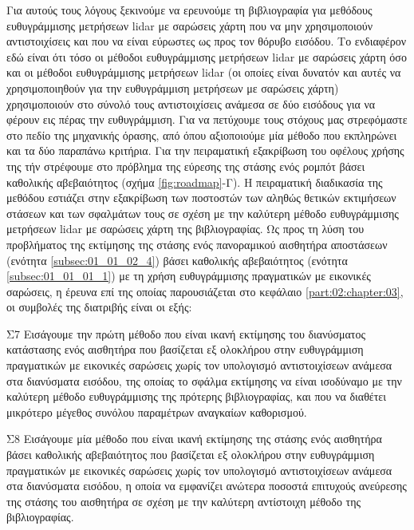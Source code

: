 Για αυτούς τους λόγους ξεκινούμε να ερευνούμε τη βιβλιογραφία για μεθόδους
ευθυγράμμισης μετρήσεων lidar με σαρώσεις χάρτη που να μην χρησιμοποιούν
αντιστοιχίσεις και που να είναι εύρωστες ως προς τον θόρυβο εισόδου. Το
ενδιαφέρον εδώ είναι ότι τόσο οι μέθοδοι ευθυγράμμισης μετρήσεων lidar με
σαρώσεις χάρτη όσο και οι μέθοδοι ευθυγράμμισης μετρήσεων lidar (οι οποίες
είναι δυνατόν και αυτές να χρησιμοποιηθούν για την ευθυγράμμιση μετρήσεων με
σαρώσεις χάρτη) χρησιμοποιούν στο σύνολό τους αντιστοιχίσεις ανάμεσα σε δύο
εισόδους για να φέρουν εις πέρας την ευθυγράμμιση. Για να πετύχουμε τους
στόχους μας στρεφόμαστε στο πεδίο της μηχανικής όρασης, από όπου αξιοποιούμε
μία μέθοδο που εκπληρώνει και τα δύο παραπάνω κριτήρια. Για την πειραματική
εξακρίβωση του οφέλους χρήσης της τήν στρέφουμε στο πρόβλημα της εύρεσης της
στάσης ενός ρομπότ βάσει καθολικής αβεβαιότητος (σχήμα \ref{fig:roadmap}-Γ). Η
πειραματική διαδικασία της μεθόδου εστιάζει στην εξακρίβωση των ποστοστών των
αληθώς θετικών εκτιμήσεων στάσεων και των σφαλμάτων τους σε σχέση με την
καλύτερη μέθοδο ευθυγράμμισης μετρήσεων lidar με σαρώσεις χάρτη της
βιβλιογραφίας. Ως προς τη λύση του προβλήματος της εκτίμησης της στάσης ενός
πανοραμικού αισθητήρα αποστάσεων (ενότητα \ref{subsec:01_01_02_4}) βάσει
καθολικής αβεβαιότητος (ενότητα \ref{subsec:01_01_01_1}) με τη χρήση
ευθυγράμμισης πραγματικών με εικονικές σαρώσεις, η έρευνα επί της οποίας
παρουσιάζεται στο κεφάλαιο \ref{part:02:chapter:03}, οι συμβολές της διατριβής
είναι οι εξής:

\begin{bw_box}
\begin{customcontribution}{Σ7}
  \label{contribution:07}
  Εισάγουμε την πρώτη μέθοδο που είναι ικανή εκτίμησης του διανύσματος
  κατάστασης ενός αισθητήρα που βασίζεται εξ ολοκλήρου στην ευθυγράμμιση
  πραγματικών με εικονικές σαρώσεις χωρίς τον υπολογισμό αντιστοιχίσεων ανάμεσα
  στα διανύσματα εισόδου, της οποίας το σφάλμα εκτίμησης να είναι ισοδύναμο με
  την καλύτερη μέθοδο ευθυγράμμισης της πρότερης βιβλιογραφίας, και που να
  διαθέτει μικρότερο μέγεθος συνόλου παραμέτρων αναγκαίων καθορισμού.
  \cite{Filotheou2022e}
\end{customcontribution}
\end{bw_box}

\begin{bw_box}
\begin{customcontribution}{Σ8}
  \label{contribution:08}
  Εισάγουμε μία μέθοδο που είναι ικανή εκτίμησης της στάσης ενός αισθητήρα
  βάσει καθολικής αβεβαιότητος που βασίζεται εξ ολοκλήρου στην ευθυγράμμιση
  πραγματικών με εικονικές σαρώσεις χωρίς τον υπολογισμό αντιστοιχίσεων ανάμεσα
  στα διανύσματα εισόδου, η οποία να εμφανίζει ανώτερα ποσοστά επιτυχούς
  ανεύρεσης της στάσης του αισθητήρα σε σχέση με την καλύτερη αντίστοιχη μέθοδο
  της βιβλιογραφίας.
\end{customcontribution}
\end{bw_box}


